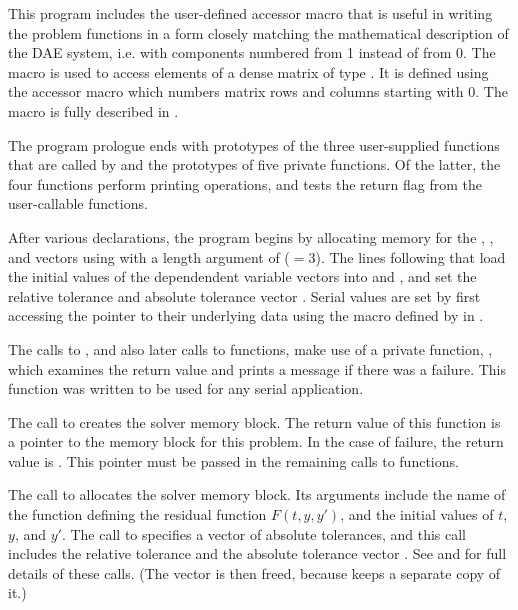 This program includes the user-defined accessor macro
 that is useful in writing the problem functions in a form
closely matching the mathematical description of the DAE system,
i.e. with components numbered from 1 instead of from 0.
The  macro is used to access elements of a dense matrix of
type . It is defined using the {\dense} accessor macro
 which numbers matrix rows and columns starting with
0. The macro  is fully described in .

The program prologue ends with prototypes of the three user-supplied functions 
that are called by {\ida} and the prototypes of five private functions.
Of the latter, the four  functions perform printing
operations, and   tests the return flag from the {\ida}
user-callable functions.

After various declarations, the  program begins by
allocating memory for the , , and  vectors using
 with a length argument of  ($= 3$). The
lines following that load the initial values of the dependendent
variable vectors into  and , and set the relative tolerance 
 and absolute tolerance vector . Serial  
values are set by first accessing the pointer to their underlying data using
the macro  defined by {\nvecs} in .

The calls to , and also later calls to 
functions, make use of a private function, , which examines
the return value and prints a message if there was a failure.  This
 function was written to be used for any serial {\sundials}
application.

The call to  creates the {\ida} solver memory block.
The return value of this function is a pointer to the memory block for this
problem.  In the case of failure, the return value is .  This
pointer must be passed in the remaining calls to {\ida} functions.

The call to  allocates the solver memory block.
Its arguments include the name of the {\C} function  defining the
residual function $F(t,y,y')$, and the initial values of $t$, $y$, and $y'$.
The call to  specifies a vector of absolute tolerances, and
this call includes the relative tolerance  and the absolute tolerance
vector .  See  and 
for full details of these calls.  (The  vector is then freed,
because {\ida} keeps a separate copy of it.)

